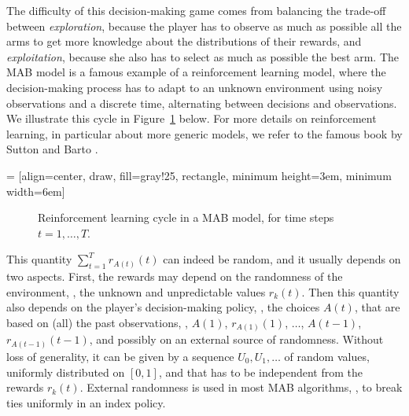 The difficulty of this decision-making game comes from balancing the trade-off between \emph{exploration}, because the player has to observe as much as possible all the arms to get more knowledge about the distributions of their rewards, and \emph{exploitation}, because she also has to select as much as possible the best arm.
The MAB model is a famous example of a reinforcement learning model, where the decision-making process has to adapt to an unknown environment using noisy observations and a discrete time, alternating between decisions and observations.
We illustrate this cycle in Figure~\ref{fig:2:ReinforcementLearningCycleMABmodel} below.
For more details on reinforcement learning, in particular about more generic models, we refer to the famous book by Sutton and Barto \cite{SuttonBarto2018}.


 = [align=center, draw, fill=gray!25, rectangle, minimum height=3em, minimum width=6em]
\begin{figure}[h!]
    \centering
\caption{Reinforcement learning cycle in a MAB model, for time steps $t=1,\dots,T$.}
\label{fig:2:ReinforcementLearningCycleMABmodel}
\end{figure}


This quantity $\sum_{t=1}^T r_{A(t)}(t)$ can indeed be random, and it usually depends on two aspects.
First, the rewards may depend on the randomness of the environment, \ie, the unknown and unpredictable values $r_k(t)$.
Then this quantity also depends on the player's decision-making policy, \ie, the choices $A(t)$, that are based on (all) the past observations, \ie, $A(1)$, $r_{A(1)}(1)$, $\dots$, $A(t-1)$, $r_{A(t-1)}(t-1)$, and possibly on an external source of randomness.
%
Without loss of generality, it can be given by a sequence $U_0,U_1,\dots$ of \iid{} random values, uniformly distributed on $[0,1]$, and that has to be independent from the rewards $r_k(t)$.
External randomness is used in most MAB algorithms, \eg, to break ties uniformly in an index policy.


